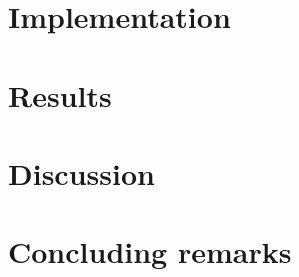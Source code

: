 \documentclass[norsk,a4paper,12pt]{article}
\begin{document}
\section{Implementation}



\section{Results}

\section{Discussion}


\section{Concluding remarks}


\end{document}
